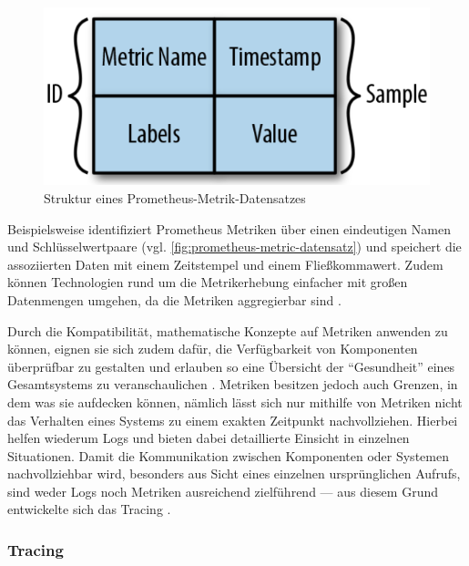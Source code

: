 \begin{figure}
\centering
\includegraphics[width=\linewidth]{img/03_methoden/prometheus-metric-sample.png}
\caption{Struktur eines Prometheus-Metrik-Datensatzes \cite{DistributedSystemsObservability}}
\label{fig:prometheus-metric-datensatz}
\end{figure}

Beispielsweise identifiziert Prometheus \cite{Prometheus} Metriken über einen eindeutigen Namen und Schlüsselwertpaare (vgl. \autoref{fig:prometheus-metric-datensatz}) und speichert die assoziierten Daten mit einem Zeitstempel und einem Fließkommawert. Zudem können Technologien rund um die Metrikerhebung einfacher mit großen Datenmengen umgehen, da die Metriken aggregierbar sind \cite{DistributedSystemsObservability}.

Durch die Kompatibilität, mathematische Konzepte auf Metriken anwenden zu können, eignen sie sich zudem dafür, die Verfügbarkeit von Komponenten überprüfbar zu gestalten und erlauben so eine Übersicht der \enquote{Gesundheit} eines Gesamtsystems zu veranschaulichen \cite{MultilevelObservabilityInCloudOrchestration} \cite{DistributedSystemsObservability}. Metriken besitzen jedoch auch Grenzen, in dem was sie aufdecken können, nämlich lässt sich nur mithilfe von Metriken nicht das Verhalten eines Systems zu einem exakten Zeitpunkt nachvollziehen. Hierbei helfen wiederum Logs und bieten dabei detaillierte Einsicht in einzelnen Situationen. Damit die Kommunikation zwischen Komponenten oder Systemen nachvollziehbar wird, besonders aus Sicht eines einzelnen ursprünglichen Aufrufs, sind weder Logs noch Metriken ausreichend zielführend --- aus diesem Grund entwickelte sich das Tracing \cite{MultilevelObservabilityInCloudOrchestration} \cite{DistributedSystemsObservability}.

\subsubsection{Tracing}
\label{sec:tracing}

